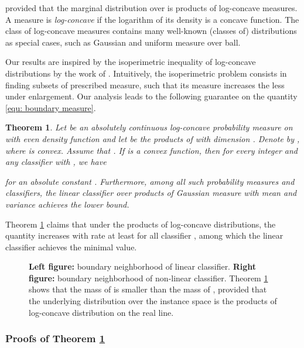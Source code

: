 \documentclass[11pt]{article}
\newtheorem{theorem}{Theorem}[section]
\newcommand{\0}{\mathbf{0}}
\newcommand{\1}{\mathbf{1}}
\begin{document}
provided that the marginal distribution over  is products of log-concave measures. A measure is \emph{log-concave} if the logarithm of its density is a concave function. The class of log-concave measures contains many well-known (classes of) distributions as special cases, such as Gaussian and uniform measure over ball.




Our results are inspired by the isoperimetric inequality of log-concave distributions by the work of \cite{barthe2001extremal}. Intuitively, the isoperimetric problem consists in finding subsets of prescribed measure, such that its measure increases the less under enlargement. Our analysis leads to the following guarantee on the quantity \eqref{equ: boundary measure}.


\begin{theorem}
\label{theorem: vulnerability}
Let  be an absolutely continuous log-concave probability measure on  with even density function and let  be the products of  with dimension . Denote by , where  is convex. Assume that . If  is a convex function, then for every integer  and any classifier  with , we have

for an absolute constant . Furthermore, among all such probability measures and classifiers, the linear classifier over products of Gaussian measure with mean  and variance  achieves the lower bound.
\end{theorem}


Theorem \ref{theorem: vulnerability} claims that under the products of log-concave distributions, the quantity  increases with rate at least  for all classifier , among which the linear classifier achieves the minimal value.


\begin{figure}[t]
\centering
{}
\caption{\textbf{Left figure:} boundary neighborhood of linear classifier. \textbf{Right figure:} boundary neighborhood of non-linear classifier. Theorem \ref{theorem: vulnerability} shows that the mass of  is smaller than the mass of , provided that the underlying distribution over the instance space is the products of log-concave distribution on the real line.}
\label{figure: isoperimetry}
\end{figure}

\subsubsection{Proofs of Theorem \ref{theorem: vulnerability}}
\end{document}
